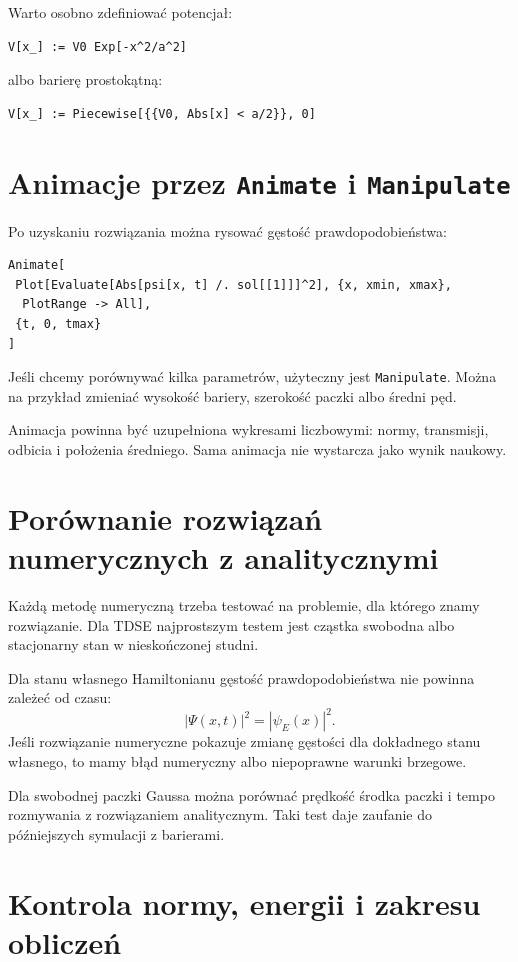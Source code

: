 Warto osobno zdefiniować potencjał:
\begin{verbatim}
V[x_] := V0 Exp[-x^2/a^2]
\end{verbatim}
albo barierę prostokątną:
\begin{verbatim}
V[x_] := Piecewise[{{V0, Abs[x] < a/2}}, 0]
\end{verbatim}

\section{Animacje przez \texttt{Animate} i \texttt{Manipulate}}

Po uzyskaniu rozwiązania można rysować gęstość prawdopodobieństwa:
\begin{verbatim}
Animate[
 Plot[Evaluate[Abs[psi[x, t] /. sol[[1]]]^2], {x, xmin, xmax},
  PlotRange -> All],
 {t, 0, tmax}
]
\end{verbatim}
Jeśli chcemy porównywać kilka parametrów, użyteczny jest \texttt{Manipulate}. Można na przykład zmieniać wysokość bariery, szerokość paczki albo średni pęd.

Animacja powinna być uzupełniona wykresami liczbowymi: normy, transmisji, odbicia i położenia średniego. Sama animacja nie wystarcza jako wynik naukowy.

\section{Porównanie rozwiązań numerycznych z analitycznymi}

Każdą metodę numeryczną trzeba testować na problemie, dla którego znamy rozwiązanie. Dla TDSE najprostszym testem jest cząstka swobodna albo stacjonarny stan w nieskończonej studni.

Dla stanu własnego Hamiltonianu gęstość prawdopodobieństwa nie powinna zależeć od czasu:
\begin{equation}
    |\Psi(x,t)|^2=|\psi_E(x)|^2.
\end{equation}
Jeśli rozwiązanie numeryczne pokazuje zmianę gęstości dla dokładnego stanu własnego, to mamy błąd numeryczny albo niepoprawne warunki brzegowe.

Dla swobodnej paczki Gaussa można porównać prędkość środka paczki i tempo rozmywania z rozwiązaniem analitycznym. Taki test daje zaufanie do późniejszych symulacji z barierami.

\section{Kontrola normy, energii i zakresu obliczeń}


